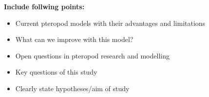 \textbf{Include follwing points:}
\begin{itemize}
    \item Current pteropod models with their advantages and limitations
    \item What can we improve with this model?
    \item Open questions in pteropod research and modelling
    \item Key questions of this study
    \item Clearly state hypotheses/aim of study
\end{itemize}






















